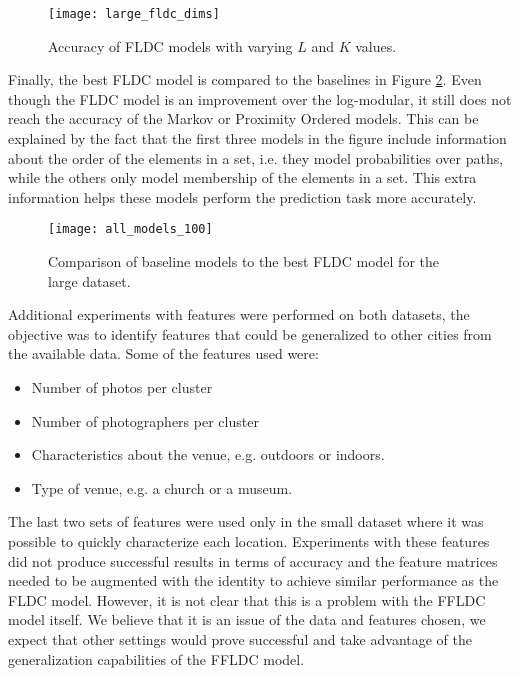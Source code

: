 \begin{figure}
  \centering
  \texttt{[image: large\_fldc\_dims]}
  \caption{Accuracy of FLDC models with varying $L$ and $K$ values.}
  \label{fig:grid_search_large}
\end{figure}

Finally, the best FLDC model is compared to the baselines in Figure \ref{fig:all_models_100}. Even though the FLDC model is an improvement over the log-modular, it still does not reach the accuracy of the Markov or Proximity Ordered models. This can be explained by the fact that the first three models in the figure include information about the order of the elements in a set, i.e. they model probabilities over paths, while the others only model membership of the elements in a set. This extra information helps these models perform the prediction task more accurately.

\begin{figure}
  \centering
  \texttt{[image: all\_models\_100]}
  \caption{Comparison of baseline models to the best FLDC model for the large dataset.}
  \label{fig:all_models_100}
\end{figure}

Additional experiments with features were performed on both datasets, the objective was to identify features that could be generalized to other cities from the available data. Some of the features used were:

\begin{itemize}
  \item Number of photos per cluster
  \item Number of photographers per cluster
  \item Characteristics about the venue, e.g. outdoors or indoors.
  \item Type of venue, e.g. a church or a museum.
\end{itemize}

The last two sets of features were used only in the small dataset where it was possible to quickly characterize each location. Experiments with these features did not produce successful results in terms of accuracy and the feature matrices needed to be augmented with the identity to achieve similar performance as the FLDC model. However, it is not clear that this is a problem with the FFLDC model itself. We believe that it is an issue of the data and features chosen, we expect that other settings would prove successful and take advantage of the generalization capabilities of the FFLDC model.
